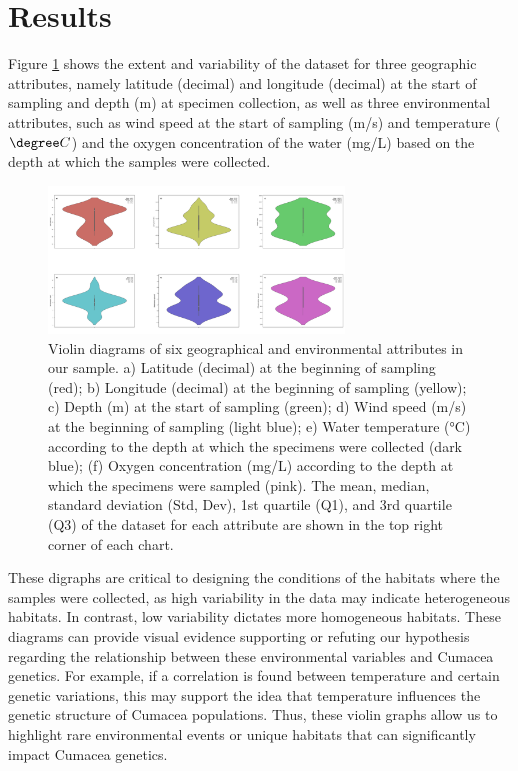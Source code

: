 \section{Results}\label{results}

Figure \ref{fig:fig1} shows the extent and variability of the dataset for three geographic attributes, namely latitude (decimal) and longitude (decimal) at the start of sampling and depth (m) at specimen collection, as well as three environmental attributes, such as wind speed at the start of sampling (m/s) and temperature ($\degree C$) and the oxygen concentration of the water (mg/L) based on the depth at which the samples were collected.

\begin{figure}[]
    \centering
    \includegraphics[width=0.7\textwidth]{figure1.jpg}
    \caption{Violin diagrams of six geographical and environmental attributes in our sample. a) Latitude (decimal) at the beginning of sampling (red); b) Longitude (decimal) at the beginning of sampling (yellow); c) Depth (m) at the start of sampling (green); d) Wind speed (m/s) at the beginning of sampling (light blue); e) Water temperature (°C) according to the depth at which the specimens were collected (dark blue); (f) Oxygen concentration (mg/L) according to the depth at which the specimens were sampled (pink). The mean, median, standard deviation (Std, Dev), 1st quartile (Q1), and 3rd quartile (Q3) of the dataset for each attribute are shown in the top right corner of each chart. \label{fig:fig1}}
\end{figure}

These digraphs are critical to designing the conditions of the habitats where the samples were collected, as high variability in the data may indicate heterogeneous habitats. In contrast, low variability dictates more homogeneous habitats. These diagrams can provide visual evidence supporting or refuting our hypothesis regarding the relationship between these environmental variables and Cumacea genetics. For example, if a correlation is found between temperature and certain genetic variations, this may support the idea that temperature influences the genetic structure of Cumacea populations. Thus, these violin graphs allow us to highlight rare environmental events or unique habitats that can significantly impact Cumacea genetics. 

